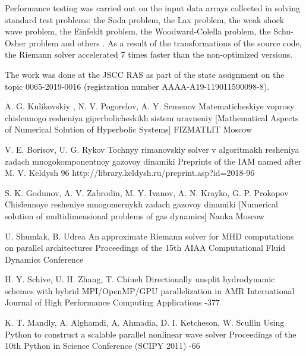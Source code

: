 \documentclass[utf8,english]{psta}%
\begin{document}
Performance testing was carried out on the input data arrays collected in solving standard test problems: the Soda problem, the Lax problem, the weak shock wave problem, the Einfeldt problem, the Woodward-Colella problem, the Schu-Osher problem and others \cite{BulVolTest}.
As a result of the transformations of the source code, the Riemann solver accelerated 7 times faster than the non-optimized versions.

The work was done at the JSCC RAS as part of the state assignment on the topic 0065-2019-0016 (registration number AAAA-A19-119011590098-8).

\begin{thebibliography}{30}

\by A. G. Kulikovskiy , N. V. Pogorelov, A. Y. Semenov
\book Matematicheskiye voprosy chislennogo resheniya giperbolicheskikh sistem uravneniy [Mathematical Aspects of Numerical Solution of Hyperbolic Systems]
\publ FIZMATLIT
\publaddr Moscow

\by V. E. Borisov, U. G. Rykov
\preprint Tochnyy rimanovskiy solver v algoritmakh resheniya zadach mnogokomponentnoy gazovoy dinamiki
\preprintinfo Preprints of the IAM named after M. V. Keldysh 96
\URL http://library.keldysh.ru/preprint.asp?id=2018-96

\by S. K. Godunov, A. V. Zabrodin, M. Y. Ivanov, A. N. Krayko, G. P. Prokopov
\book Chislennoye resheniye mnogomernykh zadach gazovoy dinamiki [Numerical solution of multidimensional problems of gas dynamics]
\publ Nauka
\publaddr Moscow

\by U. Shumlak, B. Udrea
\paper An approximate Riemann solver for MHD computations on parallel architectures
\jour Proceedings of the 15th AIAA Computational Fluid Dynamics Conference

\by H. Y. Schive, U. H. Zhang, T. Chiueh
\paper Directionally unsplit hydrodynamic schemes with hybrid MPI/OpenMP/GPU parallelization in AMR
\jour International Journal of High Performance Computing Applications
-377

\by K. T. Mandly, A. Alghamdi, A. Ahmadia, D. I. Ketcheson, W. Scullin
\paper Using Python to construct a scalable parallel nonlinear wave solver
\jour Proceedings of the 10th Python in Science Conference (SCIPY 2011)
-66


\end{thebibliography}
\end{document}
